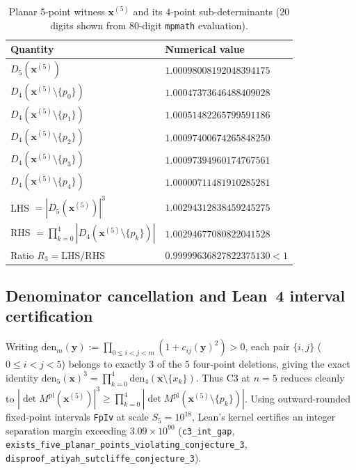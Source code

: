 \documentclass[11pt,reqno]{amsart}
\theoremstyle{remark}
\begin{document}
\begin{table}[h]
\centering
\small
\caption{Planar $5$-point witness $\mathbf{x}^{(5)}$ and its $4$-point sub-determinants ($20$ digits shown from $80$-digit \texttt{mpmath} evaluation).}
\label{tab:n5-values}
\begin{tabular}{ll}
\toprule
Quantity & Numerical value \\
\midrule
$D_5(\mathbf{x}^{(5)})$ & $1.00098008192048394175$ \\
$D_4(\mathbf{x}^{(5)} \setminus \{p_0\})$ & $1.00047373646488409028$ \\
$D_4(\mathbf{x}^{(5)} \setminus \{p_1\})$ & $1.00051482265799591186$ \\
$D_4(\mathbf{x}^{(5)} \setminus \{p_2\})$ & $1.00097400674265848250$ \\
$D_4(\mathbf{x}^{(5)} \setminus \{p_3\})$ & $1.00097394960174767561$ \\
$D_4(\mathbf{x}^{(5)} \setminus \{p_4\})$ & $1.00000711481910285281$ \\
\midrule
LHS $= |D_5(\mathbf{x}^{(5)})|^3$ & $1.00294312838459245275$ \\
RHS $= \prod_{k=0}^4 |D_4(\mathbf{x}^{(5)} \setminus \{p_k\})|$ & $1.00294677080822041528$ \\
Ratio $R_3 = \mathrm{LHS}/\mathrm{RHS}$ & $0.99999636827822375130 < 1$ \\
\bottomrule
\end{tabular}
\end{table}

\subsection{Denominator cancellation and Lean~4 interval certification}
Writing $\mathrm{den}_m(\mathbf{y}) := \prod_{0 \le i < j < m}(1 + c_{ij}(\mathbf{y})^2) > 0$, each pair $\{i, j\}$ ($0 \le i < j < 5$) belongs to exactly $3$ of the $5$ four-point deletions, giving the exact identity $\mathrm{den}_5(\mathbf{x})^3 = \prod_{k=0}^{4} \mathrm{den}_4(\mathbf{x} \setminus \{x_k\})$.
Thus C3 at $n = 5$ reduces cleanly to $|\det M^{\mathrm{pl}}(\mathbf{x}^{(5)})|^3 \ge \prod_{k=0}^{4} |\det M^{\mathrm{pl}}(\mathbf{x}^{(5)} \setminus \{p_k\})|$.
Using outward-rounded fixed-point intervals \texttt{FpIv} at scale $S_5 = 10^{18}$, Lean's kernel certifies an integer separation margin exceeding $3.09 \times 10^{90}$ (\texttt{c3\_int\_gap}, \texttt{exists\_five\_planar\_points\_violating\_conjecture\_3}, \texttt{disproof\_atiyah\_sutcliffe\_conjecture\_3}).
\end{document}
